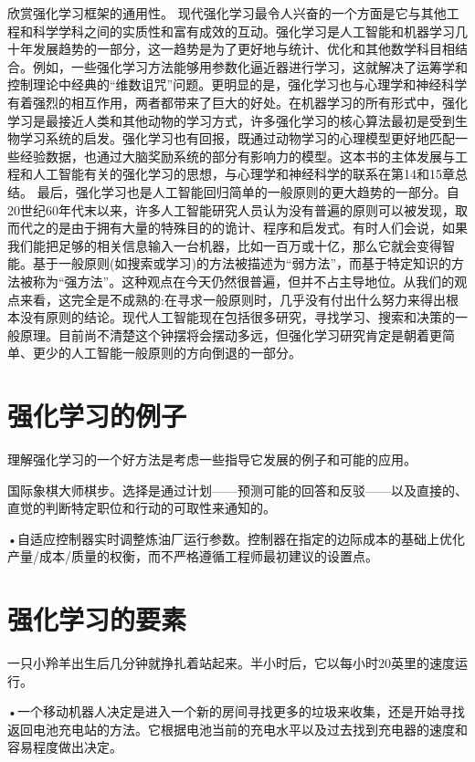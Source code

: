 欣赏强化学习框架的通用性。
现代强化学习最令人兴奋的一个方面是它与其他工程和科学学科之间的实质性和富有成效的互动。强化学习是人工智能和机器学习几十年发展趋势的一部分，这一趋势是为了更好地与统计、优化和其他数学科目相结合。例如，一些强化学习方法能够用参数化逼近器进行学习，这就解决了运筹学和控制理论中经典的“维数诅咒”问题。更明显的是，强化学习也与心理学和神经科学有着强烈的相互作用，两者都带来了巨大的好处。在机器学习的所有形式中，强化学习是最接近人类和其他动物的学习方式，许多强化学习的核心算法最初是受到生物学习系统的启发。强化学习也有回报，既通过动物学习的心理模型更好地匹配一些经验数据，也通过大脑奖励系统的部分有影响力的模型。这本书的主体发展与工程和人工智能有关的强化学习的思想，与心理学和神经科学的联系在第14和15章总结。
最后，强化学习也是人工智能回归简单的一般原则的更大趋势的一部分。自20世纪60年代末以来，许多人工智能研究人员认为没有普遍的原则可以被发现，取而代之的是由于拥有大量的特殊目的的诡计、程序和启发式。有时人们会说，如果我们能把足够的相关信息输入一台机器，比如一百万或十亿，那么它就会变得智能。基于一般原则(如搜索或学习)的方法被描述为“弱方法”，而基于特定知识的方法被称为“强方法”。这种观点在今天仍然很普遍，但并不占主导地位。从我们的观点来看，这完全是不成熟的:在寻求一般原则时，几乎没有付出什么努力来得出根本没有原则的结论。现代人工智能现在包括很多研究，寻找学习、搜索和决策的一般原理。目前尚不清楚这个钟摆将会摆动多远，但强化学习研究肯定是朝着更简单、更少的人工智能一般原则的方向倒退的一部分。


\section{强化学习的例子}

理解强化学习的一个好方法是考虑一些指导它发展的例子和可能的应用。

国际象棋大师棋步。选择是通过计划——预测可能的回答和反驳——以及直接的、直觉的判断特定职位和行动的可取性来通知的。

•自适应控制器实时调整炼油厂运行参数。控制器在指定的边际成本的基础上优化产量/成本/质量的权衡，而不严格遵循工程师最初建议的设置点。

\section{强化学习的要素}

一只小羚羊出生后几分钟就挣扎着站起来。半小时后，它以每小时20英里的速度运行。

•一个移动机器人决定是进入一个新的房间寻找更多的垃圾来收集，还是开始寻找返回电池充电站的方法。它根据电池当前的充电水平以及过去找到充电器的速度和容易程度做出决定。

